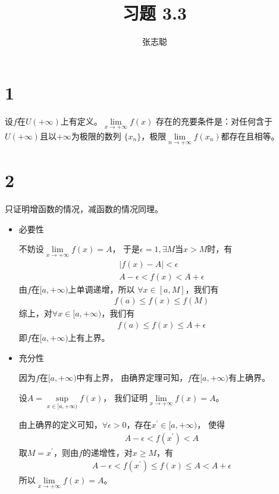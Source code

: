 \documentclass{article}
\begin{document}
\title{习题 3.3}
\author{张志聪}
\maketitle

\section*{1}

设$f$在$U(+\infty)$上有定义。$\lim\limits_{x \to +\infty}f(x)$
存在的充要条件是：对任何含于$U(+\infty)$且以$+\infty$为极限的数列
$\{x_n\}$，极限$\lim\limits_{n \to +\infty}f(x_n)$都存在且相等。

\section*{2}

只证明增函数的情况，减函数的情况同理。

\begin{itemize}
  \item 必要性

        不妨设$\lim\limits_{x \to +\infty}f(x) = A$，
        于是$\epsilon = 1, \exists M$当$x > M$时，有
        \begin{align*}
          |f(x) - A| < \epsilon \\
          A - \epsilon < f(x) < A + \epsilon
        \end{align*}
        由$f$在$[a, +\infty)$上单调递增，所以
        $\forall x \in [a, M]$，我们有
        \begin{align*}
          f(a) \leq f(x) \leq f(M)
        \end{align*}
        综上，对$\forall x \in [a, +\infty)$，我们有
        \begin{align*}
          f(a) \leq f(x) \leq A + \epsilon
        \end{align*}
        即$f$在$[a, +\infty)$上有上界。

  \item 充分性

        因为$f$在$[a, +\infty)$中有上界，
        由确界定理可知，$f$在$[a, +\infty)$有上确界。

        设$A = \sup\limits_{x \in [a, +\infty)} f(x)$，
        我们证明$\lim\limits_{x \to +\infty} f(x) = A$。

        由上确界的定义可知，$\forall \epsilon > 0$，存在$x^\prime \in [a, +\infty)$，
        使得
        \begin{align*}
          A - \epsilon < f(x^\prime) < A
        \end{align*}
        取$M = x^\prime$，则由$f$的递增性，对$x \geq M$，有
        \begin{align*}
          A - \epsilon < f(x^\prime) \leq f(x) \leq A < A + \epsilon
        \end{align*}
        所以$\lim\limits_{x \to +\infty} f(x) = A$。
\end{itemize}
\end{document}
